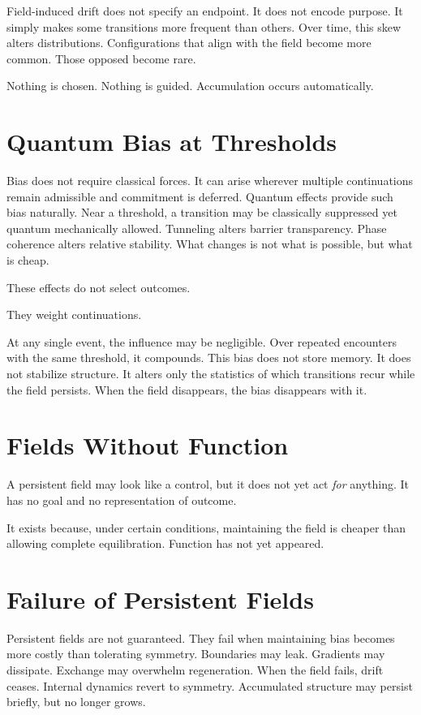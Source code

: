 \documentclass[11pt,twoside,openright]{book}
\begin{document}
Field-induced drift does not specify an endpoint. It does not encode purpose. It simply makes some transitions more frequent than others. Over time, this skew alters distributions. Configurations that align with the field become more common. Those opposed become rare.

Nothing is chosen.
Nothing is guided.
Accumulation occurs automatically.
\section*{Quantum Bias at Thresholds}

Bias does not require classical forces. It can arise wherever multiple continuations remain admissible and commitment is deferred. Quantum effects provide such bias naturally. Near a threshold, a transition may be classically suppressed yet quantum mechanically allowed. Tunneling alters barrier transparency. Phase coherence alters relative stability. What changes is not what is possible, but what is cheap.

These effects do not select outcomes.

They weight continuations.

At any single event, the influence may be negligible. Over repeated encounters with the same threshold, it compounds. This bias does not store memory. It does not stabilize structure. It alters only the statistics of which transitions recur while the field persists. When the field disappears, the bias disappears with it.

\section*{Fields Without Function}

A persistent field may look like a control, but it does not yet act \emph{for} anything. It has no goal and no representation of outcome.

It exists because, under certain conditions, maintaining the field is cheaper than allowing complete equilibration. Function has not yet appeared.

\section*{Failure of Persistent Fields}

Persistent fields are not guaranteed. They fail when maintaining bias becomes more costly than tolerating symmetry. Boundaries may leak. Gradients may dissipate. Exchange may overwhelm regeneration. When the field fails, drift ceases. Internal dynamics revert to symmetry. Accumulated structure may persist briefly, but no longer grows.
\end{document}
